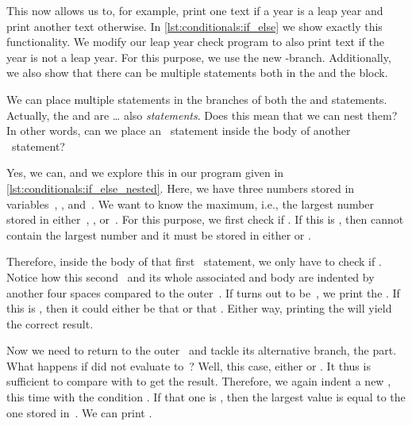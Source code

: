 This now allows us to, for example, print one text if a year is a leap year and print another text otherwise.
In \cref{lst:conditionals:if_else} we show exactly this functionality.
We modify our leap year check program to also print text if the year is not a leap year.
For this purpose, we use the new \nobreakdashes-branch.
Additionally, we also show that there can be multiple statements both in the  and the  block.

We can place multiple statements in the branches of both the  and  statements.
Actually, the  and  are {\dots} also \emph{statements}.
Does this mean that we can nest them?
In other words, can we place an ~statement inside the body of another ~statement?

Yes, we can, and we explore this in our program  given in \cref{lst:conditionals:if_else_nested}.
Here, we have three numbers stored in variables~, , and~.
We want to know the maximum, i.e., the largest number stored in either~, , or~.
For this purpose, we first check if \pythonIdx{>}.
If this is , then  cannot contain the largest number and it must be stored in either  or .

Therefore, inside the body of that first ~statement, we only have to check if .
Notice how this second~ and its whole associated  and body are indented by another four spaces compared to the outer~.
If  turns out to be~, we print the  .
If this is , then it could either be that  or that .
Either way, printing the   will yield the correct result.

Now we need to return to the outer~ and tackle its alternative branch, the  part.
What happens if  did not evaluate to~?
Well, this case, either  or .
It thus is sufficient to compare  with  to get the result.
Therefore, we again indent a new , this time with the condition .
If that one is , then the largest value is equal to the one stored in~.
We can print .

